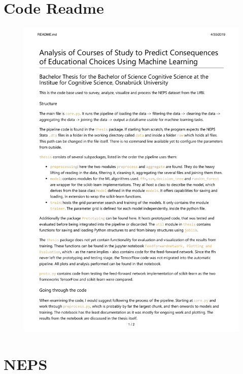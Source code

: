 \documentclass[fontsize=12pt]{scrartcl}
\begin{document}
\section{Code Readme}
\label{apx:readme}
% 
\begin{figure}[ht]
	\centering
	\includegraphics[width=.85\textwidth]{README.pdf}
\end{figure}

\section{NEPS}
\end{document}
